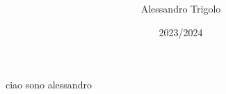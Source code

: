 \documentclass{article}
\title{\vspace{160px} \textbf{\huge{}}}
\author{\Large{Alessandro Trigolo}}
\date{2023/2024}
\begin{document}
\maketitle
\thispagestyle{empty}
\newpage




ciao sono alessandro \cite{hughes2017study}





\newpage


\end{document}
